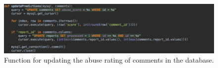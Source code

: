 \begin{figure}[H]
    \centering
    \includegraphics[width=\textwidth]{Images/Implementation/DataProcessing/AbuseDetection/UpdatingScores}
    \caption{Function for updating the abuse rating of comments in the database.}
    \label{fig:AbuseDetection-UpdatePredictions}
\end{figure}